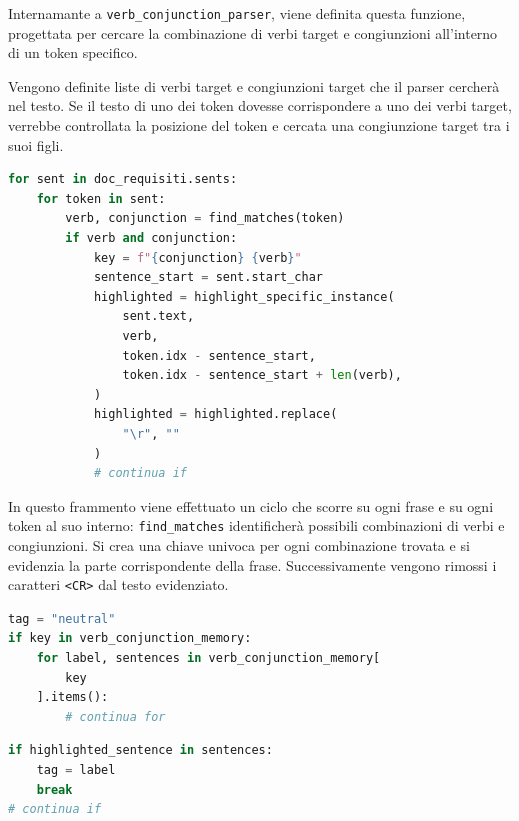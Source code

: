 \documentclass[12pt]{report}
\begin{document}
\noindent Internamante a \texttt{verb\_conjunction\_parser}, viene definita questa funzione, progettata per cercare la combinazione di verbi target e congiunzioni all'interno di un token specifico.

Vengono definite liste di verbi target e congiunzioni target che il parser cercherà nel testo. Se il testo di uno dei token dovesse corrispondere a uno dei verbi target, verrebbe controllata la posizione del token e cercata una congiunzione target tra i suoi figli.


\begin{mdframed}
\small
\begin{lstlisting}[language=Python]
for sent in doc_requisiti.sents:
    for token in sent:
        verb, conjunction = find_matches(token)
        if verb and conjunction:
            key = f"{conjunction} {verb}"
            sentence_start = sent.start_char
            highlighted = highlight_specific_instance(
                sent.text,
                verb,
                token.idx - sentence_start,
                token.idx - sentence_start + len(verb),
            )
            highlighted = highlighted.replace(
                "\r", ""
            )
            # continua if
\end{lstlisting}
\end{mdframed}

\noindent In questo frammento viene effettuato un ciclo che scorre su ogni frase e su ogni token al suo interno: \texttt{find\_matches} identificherà possibili combinazioni di verbi e congiunzioni. Si crea una chiave univoca per ogni combinazione trovata e si evidenzia la parte corrispondente della frase. Successivamente vengono rimossi i caratteri \texttt{<CR>} dal testo evidenziato.


\begin{mdframed}
\small
\begin{lstlisting}[language=Python]
tag = "neutral"
if key in verb_conjunction_memory:
    for label, sentences in verb_conjunction_memory[
        key
    ].items():
        # continua for
\end{lstlisting}
\end{mdframed}

\begin{mdframed}
\small
\begin{lstlisting}[language=Python]
if highlighted_sentence in sentences:
    tag = label
    break
# continua if
\end{lstlisting}
\end{mdframed}
\end{document}

